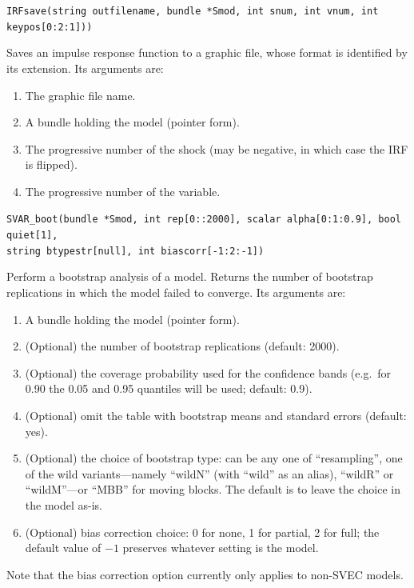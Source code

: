 \documentclass[a4paper,10pt]{article}
\newenvironment{funcdoc}[1]
{\noindent\hrulefill\newline\nopagebreak\texttt{#1}%
\nopagebreak\par\noindent\hrulefill%
\nopagebreak\par\nopagebreak\smallskip\nopagebreak\par}
{\bigskip}
\begin{document}
\begin{funcdoc}{IRFsave(string outfilename, bundle *Smod, int snum, int vnum, int keypos[0:2:1]))}
  Saves an impulse response function to a graphic file, whose format is
  identified by its extension. Its arguments are:
  \begin{enumerate}
  \item The graphic file name.
  \item A bundle holding the model (pointer form).
  \item The progressive number of the shock (may be negative, in which
    case the IRF is flipped).
  \item The progressive number of the variable.
  \end{enumerate}
\end{funcdoc}

\begin{funcdoc}{SVAR\_boot(bundle *Smod, int rep[0::2000], scalar alpha[0:1:0.9], bool
    quiet[1],\\
    string btypestr[null], int biascorr[-1:2:-1])}
  Perform a bootstrap analysis of a model. Returns the number of
  bootstrap replications in which the model failed to converge. Its
  arguments are:
  \begin{enumerate}
  \item A bundle holding the model (pointer form).
  \item (Optional) the number of bootstrap replications (default: 2000).
  \item (Optional) the coverage probability used for the confidence bands (e.g.\ 
    for 0.90 the 0.05 and 0.95 quantiles will be used; default: 0.9).
  \item (Optional) omit the table with bootstrap means and standard
    errors (default: yes).
  \item (Optional) the choice of bootstrap type: can be any one of
    ``resampling'', one of the wild variants---namely ``wildN'' (with
    ``wild'' as an alias), ``wildR'' or ``wildM''---or ``MBB'' for
    moving blocks. The default is to leave the choice in the model
    as-is.
  \item (Optional) bias correction choice: 0 for none, 1 for partial,
    2 for full; the default value of $-1$ preserves whatever setting
    is the model.
  \end{enumerate}
  Note that the bias correction option currently only applies to
  non-SVEC models.
\end{funcdoc}
\end{document}
